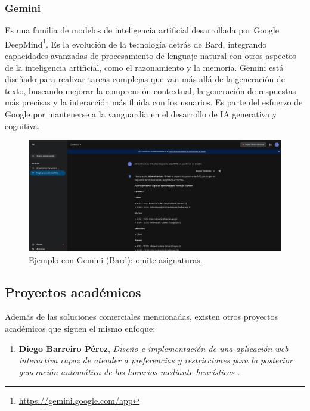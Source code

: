 \subsubsection*{Gemini}
Es una familia de modelos de inteligencia artificial desarrollada por Google DeepMind\footnote{\url{https://gemini.google.com/app}}. Es la evolución de la tecnología detrás de Bard, integrando capacidades avanzadas de procesamiento de lenguaje natural con otros aspectos de la inteligencia artificial, como el razonamiento y la memoria. Gemini está diseñado para realizar tareas complejas que van más allá de la generación de texto, buscando mejorar la comprensión contextual, la generación de respuestas más precisas y la interacción más fluida con los usuarios. Es parte del esfuerzo de Google por mantenerse a la vanguardia en el desarrollo de IA generativa y cognitiva.

\begin{landscape}
    \begin{figure}[H]
        \centering
        \includegraphics[width=1.5\textwidth, angle=0]{./imagenes/Gemini.png}
        \caption{Ejemplo con Gemini (Bard): omite asignaturas.}
    \end{figure}
\end{landscape}

\subsection{Proyectos académicos}

Además de las soluciones comerciales mencionadas, existen otros proyectos académicos que siguen el mismo enfoque:

\begin{enumerate}
    \item \textbf{Diego Barreiro Pérez}, \textit{Diseño e implementación de una aplicación web interactiva capaz de atender a preferencias y restricciones para la posterior generación automática de los horarios mediante heurísticas \cite{Barreiro}.}
\end{enumerate}


